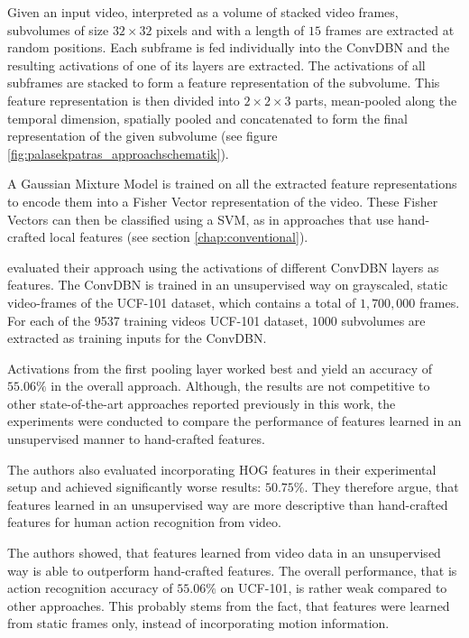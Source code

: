 Given an input video, interpreted as a volume of stacked video frames, subvolumes of size $32 \times 32$ pixels and with a length of $15$ frames are extracted at random positions.
Each subframe is fed individually into the ConvDBN and the resulting activations of one of its layers are extracted.
The activations of all subframes are stacked to form a feature representation of the subvolume.
This feature representation is then divided into $2 \times 2 \times 3$ parts, mean-pooled along the temporal dimension, spatially pooled and concatenated to form the final representation of the given subvolume (see figure \ref{fig:palasekpatras_approachschematik}). \cite{lee_convolutional_2009-1}

A Gaussian Mixture Model is trained on all the extracted feature representations to encode them into a Fisher Vector representation of the video.
These Fisher Vectors can then be classified using a SVM, as in approaches that use hand-crafted local features (see section \ref{chap:conventional}).
 
\textcite{palasek_action_2016} evaluated their approach using the activations of different ConvDBN layers as features.
The ConvDBN is trained in an unsupervised way on grayscaled, static video-frames of the UCF-101 dataset, which contains a total of $1,700,000$ frames.
For each of the 9537 training videos UCF-101 dataset, $1000$ subvolumes are extracted as training inputs for the ConvDBN.

Activations from the first pooling layer worked best and yield an accuracy of $55.06\%$ in the overall approach.
Although, the results are not competitive to other state-of-the-art approaches reported previously in this work, the experiments were conducted to compare the performance of features learned in an unsupervised manner to hand-crafted features.

The authors also evaluated incorporating HOG features in their experimental setup and achieved significantly worse results: $50.75\%$.
They therefore argue, that features learned in an unsupervised way are more descriptive than hand-crafted features for human action recognition from video.

The authors showed, that features learned from video data in an unsupervised way is able to outperform hand-crafted features.
The overall performance, that is action recognition accuracy of $55.06\%$ on UCF-101, is rather weak compared to other approaches.
This probably stems from the fact, that features were learned from static frames only, instead of incorporating motion information.

